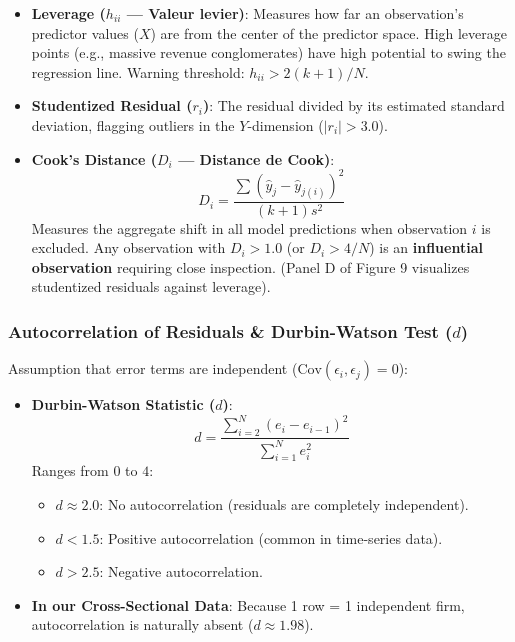 \documentclass[
]{article}
\providecommand{\tightlist}{%
  \setlength{\itemsep}{0pt}\setlength{\parskip}{0pt}}
\begin{document}
\begin{itemize}
\tightlist
\item
  \textbf{Leverage (\(h_{ii}\) --- Valeur levier)}: Measures how far an
  observation's predictor values (\(X\)) are from the center of the
  predictor space. High leverage points (e.g., massive revenue
  conglomerates) have high potential to swing the regression line.
  Warning threshold: \(h_{ii} > 2(k + 1) / N\).
\item
  \textbf{Studentized Residual (\(r_i\))}: The residual divided by its
  estimated standard deviation, flagging outliers in the \(Y\)-dimension
  (\(|r_i| > 3.0\)).
\item
  \textbf{Cook's Distance (\(D_i\) --- Distance de Cook)}:
  \[D_i = \frac{\sum (\hat{y}_j - \hat{y}_{j(i)})^2}{(k + 1) s^2}\]
  Measures the aggregate shift in all model predictions when observation
  \(i\) is excluded. Any observation with \(D_i > 1.0\) (or
  \(D_i > 4/N\)) is an \textbf{influential observation} requiring close
  inspection. (Panel D of Figure 9 visualizes studentized residuals
  against leverage).
\end{itemize}

\subsubsection{\texorpdfstring{Autocorrelation of Residuals \&
Durbin-Watson Test
(\(d\))}{Autocorrelation of Residuals \& Durbin-Watson Test (d)}}\label{autocorrelation-of-residuals-durbin-watson-test-d}

Assumption that error terms are independent
(\(\text{Cov}(\epsilon_i, \epsilon_j) = 0\)):

\begin{itemize}
\tightlist
\item
  \textbf{Durbin-Watson Statistic (\(d\))}:
  \[d = \frac{\sum_{i=2}^N (e_i - e_{i-1})^2}{\sum_{i=1}^N e_i^2}\]
  Ranges from \(0\) to \(4\):

  \begin{itemize}
  \tightlist
  \item
    \(d \approx 2.0\): No autocorrelation (residuals are completely
    independent).
  \item
    \(d < 1.5\): Positive autocorrelation (common in time-series data).
  \item
    \(d > 2.5\): Negative autocorrelation.
  \end{itemize}
\item
  \textbf{In our Cross-Sectional Data}: Because 1 row = 1 independent
  firm, autocorrelation is naturally absent (\(d \approx 1.98\)).
\end{itemize}
\end{document}
